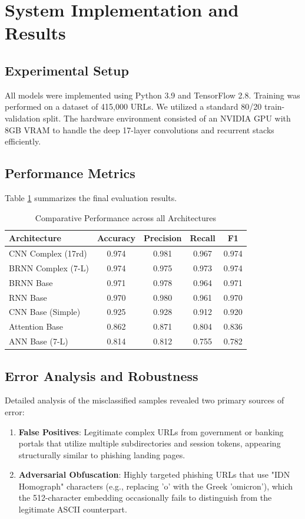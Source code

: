 \documentclass[journal,twocolumn]{IEEEtran}
\begin{document}
\section{System Implementation and Results}

\subsection{Experimental Setup}
All models were implemented using Python 3.9 and TensorFlow 2.8. Training was performed on a dataset of 415,000 URLs. We utilized a standard 80/20 train-validation split. The hardware environment consisted of an NVIDIA GPU with 8GB VRAM to handle the deep 17-layer convolutions and recurrent stacks efficiently.

\subsection{Performance Metrics}
Table \ref{tab:comp_results} summarizes the final evaluation results.

\begin{table}[htbp]
    \caption{Comparative Performance across all Architectures}
    \label{tab:comp_results}
    \centering
    \begin{tabular}{l c c c c}
    \toprule
    \textbf{Architecture} & \textbf{Accuracy} & \textbf{Precision} & \textbf{Recall} & \textbf{F1} \\
    \midrule
    CNN Complex (17rd) & 0.974 & 0.981 & 0.967 & 0.974 \\
    BRNN Complex (7-L) & 0.974 & 0.975 & 0.973 & 0.974 \\
    BRNN Base & 0.971 & 0.978 & 0.964 & 0.971 \\
    RNN Base & 0.970 & 0.980 & 0.961 & 0.970 \\
    CNN Base (Simple) & 0.925 & 0.928 & 0.912 & 0.920 \\
    Attention Base & 0.862 & 0.871 & 0.804 & 0.836 \\
    ANN Base (7-L) & 0.814 & 0.812 & 0.755 & 0.782 \\
    \bottomrule
    \end{tabular}
\end{table}

\subsection{Error Analysis and Robustness}
Detailed analysis of the misclassified samples revealed two primary sources of error:
\begin{enumerate}
    \item \textbf{False Positives}: Legitimate complex URLs from government or banking portals that utilize multiple subdirectories and session tokens, appearing structurally similar to phishing landing pages.
    \item \textbf{Adversarial Obfuscation}: Highly targeted phishing URLs that use "IDN Homograph" characters (e.g., replacing 'o' with the Greek 'omicron'), which the 512-character embedding occasionally fails to distinguish from the legitimate ASCII counterpart.
\end{enumerate}
\end{document}
